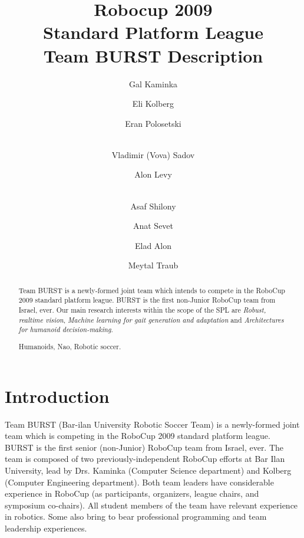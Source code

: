 \documentclass[runningheads,a4paper]{llncs}
\newcommand{\keywords}[1]{\par\addvspace\baselineskip
\noindent\keywordname\enspace\ignorespaces#1}
\begin{document}
\mainmatter  %

\title{Robocup 2009\\Standard Platform League\\Team BURST Description}


\author{Gal Kaminka
\and Eli Kolberg\and Eran Polosetski\and\\ Vladimir (Vova) Sadov\and
Alon Levy\and\\ Asaf Shilony\and Anat Sevet\and Elad Alon\and Meytal Traub}
%


%
%

\maketitle


\begin{abstract}
Team BURST is a newly-formed joint team which intends to compete in the RoboCup
2009 standard platform league. BURST is the first non-Junior RoboCup team from Israel, ever. Our main research interests within the scope of the SPL are \emph{Robust, realtime vision}, \emph{Machine learning for gait generation and adaptation} and \emph{Architectures for humanoid decision-making}.


\keywords{Humanoids, Nao, Robotic soccer.}
\end{abstract}


\section{Introduction}
Team BURST (Bar-ilan University Robotic Soccer Team) is a newly-formed joint team which is competing in the RoboCup 2009 standard platform league. BURST is the first senior (non-Junior) RoboCup team from Israel, ever. The team is composed of two previously-independent RoboCup efforts at Bar Ilan University, lead by Drs. Kaminka (Computer Science department) and Kolberg (Computer Engineering department). Both team leaders have considerable experience in RoboCup (as participants, organizers, league chairs, and symposium co-chairs). All student members of the team have relevant experience in robotics. Some also bring to bear professional programming and team leadership experiences.
\end{document}
